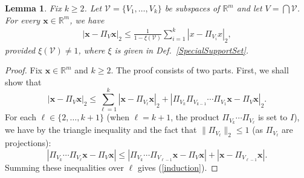 \documentclass[journal, twocolumn]{IEEEtran}
\newtheorem{lemma}{Lemma}
\begin{document}
\begin{lemma}\label{DistanceToIntersectionLemma}
Fix $k \geq 2$. Let $\mathcal{V} = \{V_1, \ldots, V_k\}$ be subspaces of $\mathbb{R}^m$ and let $V = \bigcap \mathcal{V}$. For every $\mathbf{x} \in \mathbb{R}^m$, we have
\begin{align}\label{DTILeq}
|\mathbf{x} - \Pi_V \mathbf{x}|_2 \leq \frac{1}{1 - \xi(\mathcal{V})} \sum_{i=1}^k |x - \Pi_{V_i} x|_2,
\end{align}
provided $\xi(\mathcal{V}) \neq 1$, where $\xi$ is given in Def.~\ref{SpecialSupportSet}.
\end{lemma}
\begin{proof} 
Fix $\mathbf{x} \in \mathbb{R}^m$ and $k \geq 2$. The proof consists of two parts. First, we shall show that 
\begin{equation}\label{induction}
|\mathbf{x} - \Pi_V\mathbf{x}|_2 \leq \sum_{\ell=1}^k |\mathbf{x} - \Pi_{V_{\ell}} \mathbf{x}|_2 + |\Pi_{V_{k}}\Pi_{V_{k-1}}\cdots\Pi_{V_{1}} \mathbf{x} - \Pi_V \mathbf{x}|_2.
\end{equation}
For each $\ell \in \{2, \ldots, k+1\}$ (when $\ell = k+1$, the product $\Pi_{V_k} \cdots \Pi_{V_{\ell}}$ is set to $I$), we have by the triangle inequality and the fact that $\|\Pi_{V_{\ell}}\|_2 \leq 1$ (as $\Pi_{V_{\ell}}$ are projections):
\begin{equation}
|\Pi_{V_k} \cdots \Pi_{V_{\ell}}\mathbf{x} - \Pi_V \mathbf{x}|  \leq  |\Pi_{V_k} \cdots \Pi_{V_{\ell-1}}\mathbf{x} - \Pi_V \mathbf{x}| + 
|\mathbf{x} - \Pi_{V_{\ell-1}}\mathbf{x}|.
\end{equation}
Summing these inequalities over $\ell$ gives (\ref{induction}).


\end{proof}
\end{document}

